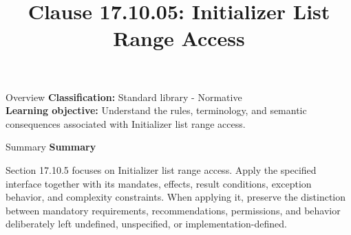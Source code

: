 \documentclass[10pt,letterpaper]{article}
\title{Clause 17.10.05: Initializer List Range Access}
\author{}
\date{}
\begin{document}
\maketitle
\begin{CornellOverviewBox}{Overview}
\textbf{Classification:} Standard library - Normative\\[2pt]
\textbf{Learning objective:} Understand the rules, terminology, and semantic consequences associated with Initializer list range access.
\end{CornellOverviewBox}\begin{CornellSummaryBox}{Summary}
{\sffamily\bfseries\color{Accent} Summary}\par\vspace{3pt}Section 17.10.5 focuses on Initializer list range access. Apply the specified interface together with its mandates, effects, result conditions, exception behavior, and complexity constraints. When applying it, preserve the distinction between mandatory requirements, recommendations, permissions, and behavior deliberately left undefined, unspecified, or implementation-defined.
\end{CornellSummaryBox}
\end{document}
